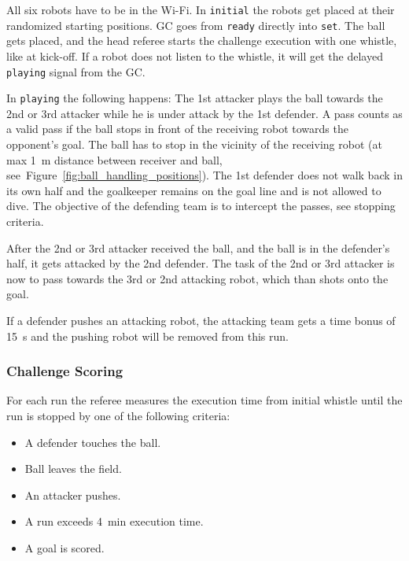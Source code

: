         All six robots have to be in the Wi-Fi. In \texttt{initial} the robots get placed at their randomized starting positions. GC goes from \texttt{ready} directly into \texttt{set}. The ball gets placed, and the head referee starts the challenge execution with one whistle, like at kick-off. If a robot does not listen to the whistle, it will get the delayed \texttt{playing} signal from the GC.

        In \texttt{playing} the following happens: The 1st attacker plays the ball towards the 2nd or 3rd attacker while he is under attack by the 1st defender.
        A pass counts as a valid pass if the ball stops in front of the receiving robot towards the opponent's goal. The ball has to stop in the vicinity of the receiving robot (at max \qty{1}{\metre} distance between receiver and ball, see~Figure~\ref{fig:ball_handling_positions}).
        The 1st defender does not walk back in its own half and the goalkeeper remains on the goal line and is not allowed to dive. The objective of the defending team is to intercept the passes, see stopping criteria.

        After the 2nd or 3rd attacker received the ball, and the ball is in the defender's half, it gets attacked by the 2nd defender. The task of the 2nd or 3rd attacker is now to pass towards the 3rd or 2nd attacking robot, which than shots onto the goal.

        If a defender pushes an attacking robot, the attacking team gets a time bonus of \qty{15}{\second} and the pushing robot will be removed from this run. 

    \subsubsection{Challenge Scoring}

        For each run the referee measures the execution time from initial whistle until the run is stopped by one of the following criteria:

        \begin{itemize}
            \item A defender touches the ball.
            \item Ball leaves the field.
            \item An attacker pushes.
            \item A run exceeds \qty{4}{\minute} execution time.
            \item A goal is scored.
        \end{itemize}

